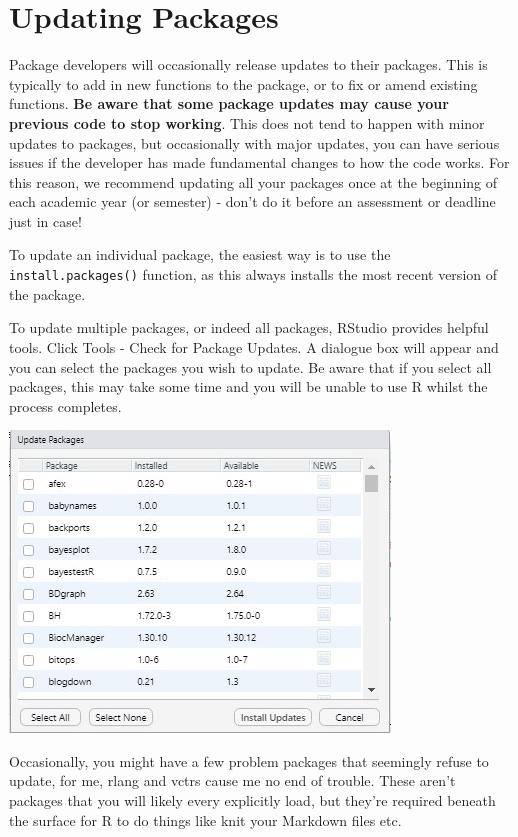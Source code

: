 \documentclass[
]{book}
\begin{document}
\hypertarget{updating-packages}{%
\section{Updating Packages}\label{updating-packages}}

Package developers will occasionally release updates to their packages. This is typically to add in new functions to the package, or to fix or amend existing functions. \textbf{Be aware that some package updates may cause your previous code to stop working}. This does not tend to happen with minor updates to packages, but occasionally with major updates, you can have serious issues if the developer has made fundamental changes to how the code works. For this reason, we recommend updating all your packages once at the beginning of each academic year (or semester) - don't do it before an assessment or deadline just in case!

To update an individual package, the easiest way is to use the \texttt{install.packages()} function, as this always installs the most recent version of the package.

To update multiple packages, or indeed all packages, RStudio provides helpful tools. Click Tools - Check for Package Updates. A dialogue box will appear and you can select the packages you wish to update. Be aware that if you select all packages, this may take some time and you will be unable to use R whilst the process completes.

\includegraphics[width=0.8\linewidth]{images/update_packages}

Occasionally, you might have a few problem packages that seemingly refuse to update, for me, rlang and vctrs cause me no end of trouble. These aren't packages that you will likely every explicitly load, but they're required beneath the surface for R to do things like knit your Markdown files etc.
\end{document}
